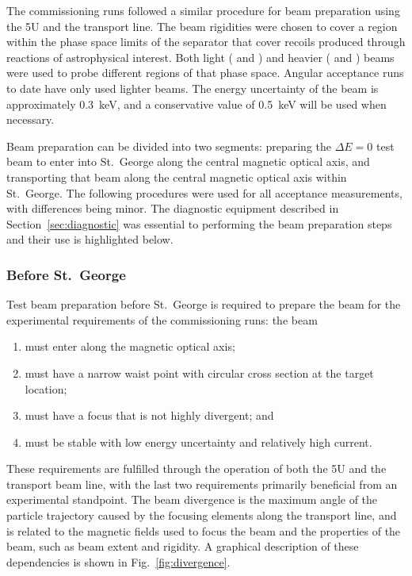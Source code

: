 The commissioning runs followed a similar procedure for beam preparation
using the 5U and the transport line. The beam rigidities were chosen to
cover a region within the phase space limits of the separator that cover
recoils produced through reactions of astrophysical interest. Both light
( and ) and heavier ( and )
beams were used to probe different regions of that phase space. Angular
acceptance runs to date have only used lighter beams. The energy
uncertainty of the beam is approximately 0.3~keV, and a conservative
value of 0.5~keV will be used when necessary.

Beam preparation can be divided into two segments: preparing the $\Delta
E = 0$ test beam to enter into St.\ George along the central magnetic
optical axis, and transporting that beam along the central magnetic
optical axis within St.\ George. The following procedures were used for
all acceptance measurements, with differences being minor. The
diagnostic equipment described in Section~\ref{sec:diagnostic} was
essential to performing the beam preparation steps and their use is
highlighted below.

\subsubsection{Before St.\ George}

Test beam preparation before St.\ George is required to prepare the beam
for the experimental requirements of the commissioning runs: the beam
\begin{enumerate}
    \item must enter along the magnetic optical axis;
    \item must have a narrow waist point with circular cross section at
        the target location;
    \item must have a focus that is not highly divergent; and
    \item must be stable with low energy uncertainty and relatively high
        current.
\end{enumerate}
These requirements are fulfilled through the operation of both the 5U
and the transport beam line, with the last two requirements primarily
beneficial from an experimental standpoint. The beam divergence is the
maximum angle of the particle trajectory caused by the focusing elements
along the transport line, and is related to the magnetic fields used to
focus the beam and the properties of the beam, such as beam extent and
rigidity. A graphical description of these dependencies is shown in
Fig.~\ref{fig:divergence}.

